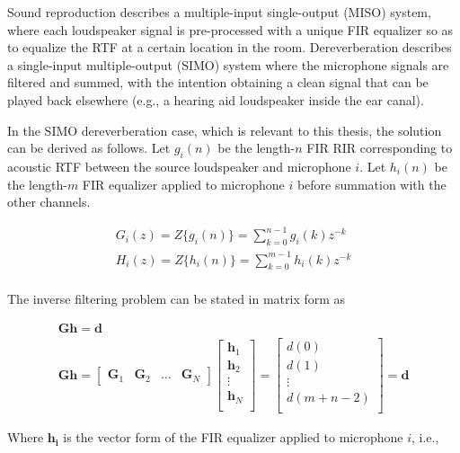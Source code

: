 Sound reproduction describes a multiple-input single-output (MISO) system, where each loudspeaker signal is pre-processed with a unique FIR equalizer so as to equalize the RTF at a certain location in the room. Dereverberation describes a single-input multiple-output (SIMO) system where the microphone signals are filtered and summed, with the intention obtaining a clean signal that can be played back elsewhere (e.g., a hearing aid loudspeaker inside the ear canal).

In the SIMO dereverberation case, which is relevant to this thesis, the solution can be derived as follows. Let $g_i(n)$ be the length-$n$ FIR RIR corresponding to acoustic RTF between the source loudspeaker and microphone $i$. Let $h_i(n)$ be the length-$m$ FIR equalizer applied to microphone $i$ before summation with the other channels. 

\begin{eqnarray}
	G_i(z) = Z\{g_i(n)\} = \sum_{k=0}^{n-1}g_i(k)z^{-k} \\
	H_i(z) = Z\{h_i(n)\} = \sum_{k=0}^{m-1}h_i(k)z^{-k} \\
\end{eqnarray}

The inverse filtering problem can be stated in matrix form as

\begin{eqnarray}
	\boldsymbol{G} \boldsymbol{h}=\boldsymbol{d} \label{eq:MINT_problem} \\
	\boldsymbol{G} \boldsymbol{h} =
	\begin{bmatrix}
		\boldsymbol{G}_1 & \boldsymbol{G}_2 & \dots& \boldsymbol{G}_N
	\end{bmatrix} 
	\begin{bmatrix}
		\boldsymbol{h}_1 \\
		\boldsymbol{h}_2 \\
		\vdots \\
		\boldsymbol{h}_N \\
	\end{bmatrix}
	=
	\begin{bmatrix}
		d(0) \\
		d(1) \\
		\vdots \\
		d(m+n-2) \\
	\end{bmatrix} 
	=
	\boldsymbol{d}
\end{eqnarray}

\noindent
Where $\boldsymbol{h_i}$ is the vector form of the FIR equalizer applied to microphone $i$, i.e.,

